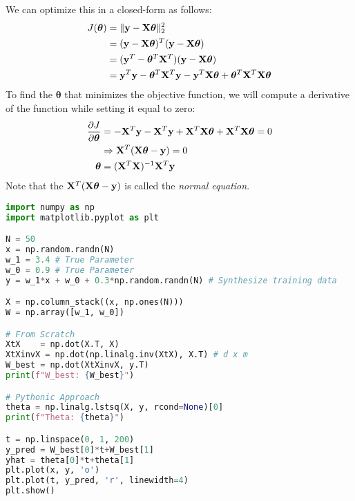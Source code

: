 We can optimize this in a closed-form as follows:
\begin{align*}
	J(\boldsymbol{\theta}) &= \|\mathbf{y}-\mathbf{X}\boldsymbol{\theta}\|^2_2 \\
			&= (\mathbf{y}-\mathbf{X}\boldsymbol{\theta})^T(\mathbf{y}-\mathbf{X}\boldsymbol{\theta})\\
			&= (\mathbf{y}^T-\boldsymbol{\theta}^T\mathbf{X}^T)(\mathbf{y}-\mathbf{X}\boldsymbol{\theta})\\
			&= {\mathbf{y}}^T{\mathbf{y}}-\boldsymbol{\theta}^T\mathbf{X}^T{\mathbf{y}}-{\mathbf{y}}^T\mathbf{X}\boldsymbol{\theta}+\boldsymbol{\theta}^T\mathbf{X}^T\mathbf{X}\boldsymbol{\theta}
\end{align*}
To find the $\boldsymbol{\theta}$ that minimizes the objective function, we will compute a derivative of the function while setting it equal to zero:
\begin{align*}
	\frac{\partial J}{\partial \boldsymbol{\theta}}&= -\mathbf{X}^T{\mathbf{y}}-\mathbf{X}^T{\mathbf{y}}+\mathbf{X}^T\mathbf{X}\boldsymbol{\theta}+\mathbf{X}^T\mathbf{X}\boldsymbol{\theta} = 0\\
	&\Rightarrow \mathbf{X}^T(\mathbf{X}\boldsymbol{\theta}-{\mathbf{y}})= 0\\
	\boldsymbol{\theta}	&= (\mathbf{X}^T\mathbf{X})^{-1}\mathbf{X}^T{\mathbf{y}}
\end{align*}
Note that the $\mathbf{X}^T(\mathbf{X}\boldsymbol{\theta}-{\mathbf{y}})$ is called the \textit{normal equation}.

\begin{lstlisting}[language=Python]
import numpy as np
import matplotlib.pyplot as plt

N = 50
x = np.random.randn(N)
w_1 = 3.4 # True Parameter
w_0 = 0.9 # True Parameter
y = w_1*x + w_0 + 0.3*np.random.randn(N) # Synthesize training data

X = np.column_stack((x, np.ones(N)))
W = np.array([w_1, w_0])

# From Scratch
XtX    = np.dot(X.T, X)
XtXinvX = np.dot(np.linalg.inv(XtX), X.T) # d x m
W_best = np.dot(XtXinvX, y.T)
print(f"W_best: {W_best}") 

# Pythonic Approach
theta = np.linalg.lstsq(X, y, rcond=None)[0]
print(f"Theta: {theta}") 

t = np.linspace(0, 1, 200)
y_pred = W_best[0]*t+W_best[1]
yhat = theta[0]*t+theta[1]
plt.plot(x, y, 'o')
plt.plot(t, y_pred, 'r', linewidth=4)
plt.show()
\end{lstlisting}

